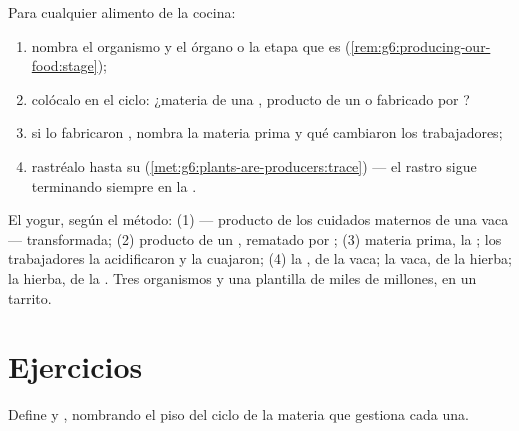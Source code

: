 \begin{method}\label{met:g6:producing-our-food:read}
Para cualquier alimento de la cocina:
\begin{enumerate}
  \item nombra el organismo y el órgano o la etapa que es
        (\cref{rem:g6:producing-our-food:stage});
  \item colócalo en el ciclo: ¿materia de una , producto de
        un  o fabricado por ?
  \item si lo fabricaron , nombra la materia prima y qué
        cambiaron los trabajadores;
  \item rastréalo hasta su 
        (\cref{met:g6:plants-are-producers:trace}) --- el rastro sigue
        terminando siempre en la .
\end{enumerate}
\end{method}

\begin{example}\label{ex:g6:producing-our-food:breakfast}
El yogur, según el método: (1)  --- producto de los cuidados
maternos de una vaca --- transformada; (2) producto de un ,
rematado por ; (3) materia prima, la ; los trabajadores
la acidificaron y la cuajaron; (4) la , de la vaca; la vaca, de la
hierba; la hierba, de la . Tres organismos y una plantilla de miles
de millones, en un tarrito.
\end{example}

\section{Ejercicios}

\begin{exercise}[$\star$]\label{exo:g6:producing-our-food:1}
Define  y , nombrando el piso del ciclo de la
materia que gestiona cada una.
\end{exercise}

